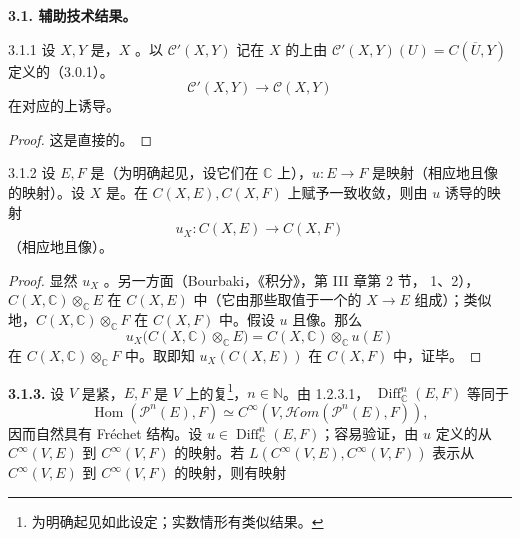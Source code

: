 \textbf{3.1. 辅助技术结果。}
\begin{SGAresult}{}{3.1.1}
设 $X,Y$ 是，$X$ 。以 $\mathcal C'(X,Y)$ 记在 $X$ 的上由 $\mathcal C'(X,Y)(U)=C(\overline U,Y)$ 定义的（3.0.1）。
\[\mathcal C'(X,Y)\longrightarrow\mathcal C(X,Y)\]
在对应的上诱导。
\end{SGAresult}
\begin{proof}这是直接的。\end{proof}
\begin{SGAresult}{}{3.1.2}
设 $E,F$ 是（为明确起见，设它们在 $\mathbb C$ 上），$u:E\to F$ 是映射（相应地且像的映射）。设 $X$ 是。在 $C(X,E),C(X,F)$ 上赋予一致收敛，则由 $u$ 诱导的映射
\[u_X:C(X,E)\longrightarrow C(X,F)\]
（相应地且像）。
\end{SGAresult}
\begin{proof}
显然 $u_X$ 。另一方面（Bourbaki，《积分》，第 III 章第 2 节， 1、2），$C(X,\mathbb C)\otimes_{\mathbb C}E$ 在 $C(X,E)$ 中（它由那些取值于一个的 $X\to E$ 组成）；类似地，$C(X,\mathbb C)\otimes_{\mathbb C}F$ 在 $C(X,F)$ 中。假设 $u$ 且像。那么
\[u_X\bigl(C(X,\mathbb C)\otimes_{\mathbb C}E\bigr)=C(X,\mathbb C)\otimes_{\mathbb C}u(E)\]
在 $C(X,\mathbb C)\otimes_{\mathbb C}F$ 中。取即知 $u_X(C(X,E))$ 在 $C(X,F)$ 中，证毕。
\end{proof}
\textbf{3.1.3.} 设 $V$ 是紧，$E,F$ 是 $V$ 上的复\footnote{为明确起见如此设定；实数情形有类似结果。}，$n\in\mathbb N$。由 1.2.3.1， $\operatorname{Diff}_{\mathbb C}^n(E,F)$ 等同于
\[\operatorname{Hom}(\mathcal P^n(E),F)\simeq C^\infty(V,\mathcal Hom(\mathcal P^n(E),F)),\]
因而自然具有 Fréchet 结构。设 $u\in\operatorname{Diff}_{\mathbb C}^n(E,F)$；容易验证，由 $u$ 定义的从 $C^\infty(V,E)$ 到 $C^\infty(V,F)$ 的映射。若 $L(C^\infty(V,E),C^\infty(V,F))$ 表示从 $C^\infty(V,E)$ 到 $C^\infty(V,F)$ 的映射，则有映射
